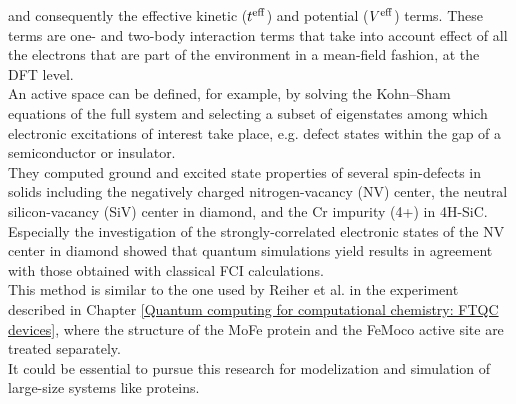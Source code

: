 and consequently the effective kinetic ($t^{{\rm eff}}$) and potential ($V^{{\rm eff}}$) terms. These terms are one- and two-body interaction terms that take into account effect of all the electrons that are part of the environment in a mean-field fashion, at the DFT level. \\
An active space can be defined, for example, by solving the Kohn–Sham equations of the full system and selecting a subset of eigenstates among which electronic excitations of interest take place, e.g. defect states within the gap of a semiconductor or insulator. \\
They computed ground and excited state properties of several spin-defects in solids including the negatively charged nitrogen-vacancy (NV) center, the neutral silicon-vacancy (SiV) center in diamond, and the Cr impurity (4+) in 4H-SiC. Especially the investigation of the strongly-correlated electronic states of the NV center in diamond showed that quantum simulations yield results in agreement with those obtained with classical FCI calculations. \\
This method is similar to the one used by Reiher et al. \cite{Reiher2017Jul} in the experiment described in Chapter \ref{Quantum computing for computational chemistry: FTQC devices}, where the structure of the MoFe protein and the FeMoco active site are treated separately. \\
It could be essential to pursue this research for modelization and simulation of large-size systems like proteins.


